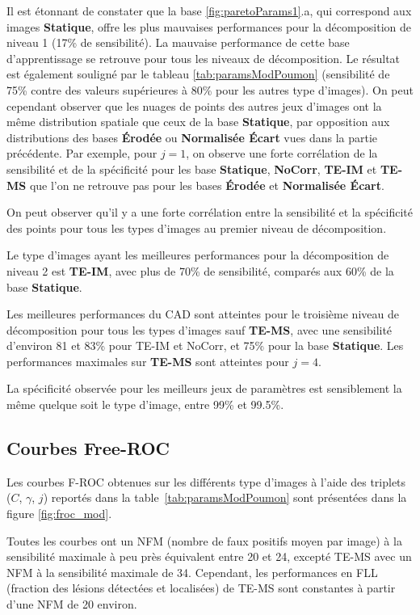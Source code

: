 Il est étonnant de constater que la base \ref{fig:paretoParams1}.a, qui correspond aux images \textbf{Statique}, offre les plus mauvaises performances pour la décomposition de niveau 1 (17\% de sensibilité). La mauvaise performance de cette base d'apprentissage se retrouve pour tous les niveaux de décomposition. Le résultat est également souligné par le tableau \ref{tab:paramsModPoumon} (sensibilité de 75\% contre des valeurs supérieures à 80\% pour les autres type d'images). On peut cependant observer que les nuages de points des autres jeux d'images ont la même distribution spatiale que ceux de la base \textbf{Statique}, par opposition aux distributions des bases \textbf{Érodée} ou \textbf{Normalisée Écart} vues dans la partie précédente. Par exemple, pour $j=1$, on observe une forte corrélation de la sensibilité et de la spécificité pour les base \textbf{Statique}, \textbf{NoCorr}, \textbf{TE-IM} et \textbf{TE-MS} que l'on ne retrouve pas pour les bases \textbf{Érodée} et \textbf{Normalisée Écart}. 

On peut observer qu'il y a une forte corrélation entre la sensibilité et la spécificité des points pour tous les types d'images au premier niveau de décomposition.

Le type d'images ayant les meilleures performances pour la décomposition de niveau 2 est \textbf{TE-IM}, avec plus de 70\% de sensibilité, comparés aux 60\% de la base \textbf{Statique}. 

Les meilleures performances du CAD sont atteintes pour le troisième niveau de décomposition pour tous les types d'images sauf \textbf{TE-MS}, avec une sensibilité d'environ 81 et 83\% pour TE-IM et NoCorr, et 75\% pour la base \textbf{Statique}. Les performances maximales sur \textbf{TE-MS} sont atteintes pour $j=4$.

La spécificité observée pour les meilleurs jeux de paramètres est sensiblement la même quelque soit le type d'image, entre 99\% et 99.5\%.

\subsection{Courbes Free-ROC}

Les courbes F-ROC obtenues sur les différents type d'images à l'aide des triplets ($C$, $\gamma$, $j$) reportés dans la table~\ref{tab:paramsModPoumon} sont présentées dans la figure \ref{fig:froc_mod}. 

Toutes les courbes ont un NFM (nombre de faux positifs moyen par image) à la sensibilité maximale à peu près équivalent entre 20 et 24, excepté TE-MS avec un NFM à la sensibilité maximale de 34. Cependant, les performances en FLL (fraction  des lésions détectées et localisées) de TE-MS sont constantes à partir d'une NFM de 20 environ. 

